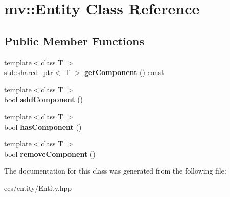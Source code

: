 \hypertarget{classmv_1_1_entity}{}\section{mv\+:\+:Entity Class Reference}
\label{classmv_1_1_entity}
\subsection*{Public Member Functions}
\begin{DoxyCompactItemize}
\item 
\mbox{\label{classmv_1_1_entity_a224021f1bce327d022f8737af68a0b31}} 
{\footnotesize template$<$class T $>$ }\\std\+::shared\+\_\+ptr$<$ T $>$ {\bfseries get\+Component} () const
\item 
\mbox{\label{classmv_1_1_entity_a6fe942a0250cfb842fcc5c004d5e139e}} 
{\footnotesize template$<$class T $>$ }\\bool {\bfseries add\+Component} ()
\item 
\mbox{\label{classmv_1_1_entity_a4e6de8eac6b6958aa2aab80aa18a10e9}} 
{\footnotesize template$<$class T $>$ }\\bool {\bfseries has\+Component} ()
\item 
\mbox{\label{classmv_1_1_entity_ac71d37b52fd82a050e76e0f3e396ec4a}} 
{\footnotesize template$<$class T $>$ }\\bool {\bfseries remove\+Component} ()
\end{DoxyCompactItemize}


The documentation for this class was generated from the following file\+:\begin{DoxyCompactItemize}
\item 
ecs/entity/Entity.\+hpp\end{DoxyCompactItemize}
